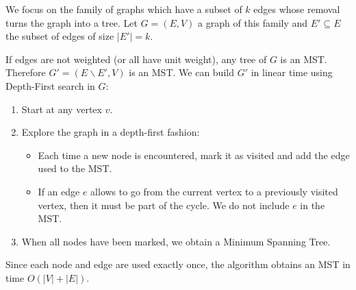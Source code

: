 
We focus on the family of graphs which have a subset of $k$ edges whose removal turns the graph into a tree. Let $G = (E, V)$ a graph of this family and $E' \subseteq E$ the subset of edges of size $|E'| = k$.

If edges are not weighted (or all have unit weight), any tree of $G$ is an MST. Therefore $G' = (E \backslash E', V)$ is an MST. We can build $G'$ in linear time using Depth-First search in $G$:

\begin{enumerate}
  \item Start at any vertex $v$.
  \item Explore the graph in a depth-first fashion:
  \begin{itemize}
    \item Each time a new node is encountered, mark it as visited and add the edge used to the MST.
    \item If an edge $e$ allows to go from the current vertex to a previously visited vertex, then it must be part of the cycle. We do not include $e$ in the MST.
  \end{itemize}
  \item When all nodes have been marked, we obtain a Minimum Spanning Tree.
\end{enumerate}

\noindent
Since each node and edge are used exactly once, the algorithm obtains an MST in time $O(|V| + |E|)$.
